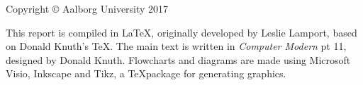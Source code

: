 {\small
\strut\vfill %
\noindent Copyright \copyright{} Aalborg University 2017\par
\vspace{0.2cm}

\noindent This report is compiled in \LaTeX, originally developed by Leslie Lamport, based on Donald Knuth's \TeX. The main text is written in \emph{Computer Modern} pt 11, designed by Donald Knuth. 
Flowcharts and diagrams are made using Microsoft Visio, Inkscape and Tikz, a \TeX package for generating graphics. }
\clearpage